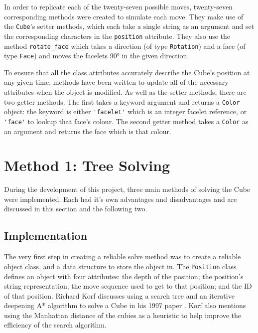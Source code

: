 \documentclass{report}
\begin{document}
    In order to replicate each of the twenty-seven possible moves, twenty-seven corresponding methods were created to simulate each move. They make use of the \lstinline|Cube|'s setter methods, which each take a single string as an argument and set the corresponding characters in the \lstinline|position| attribute. They also use the method \lstinline|rotate_face| which takes a direction (of type \lstinline|Rotation|) and a face (of type \lstinline|Face|) and moves the facelets \ang{90} in the given direction.
    
    To ensure that all the class attributes accurately describe the Cube's position at any given time, methods have been written to update all of the necessary attributes when the object is modified. As well as the setter methods, there are two getter methods. The first takes a keyword argument and returns a \lstinline|Color| object: the keyword is either \lstinline|'facelet'| which is an integer facelet reference, or \lstinline|'face'| to lookup that face's colour. The second getter method takes a \lstinline|Color| as an argument and returns the face which is that colour.
    
    \section{Method 1: Tree Solving} \label{sec:treeSolving}
    
    During the development of this project, three main methods of solving the Cube were implemented. Each had it's own advantages and disadvantages and are discussed in this section and the following two.
    
    \subsection{Implementation}
    
    The very first step in creating a reliable solve method was to create a reliable object class, and a data structure to store the object in. The \lstinline|Position| class defines an object with four attributes: the depth of the position; the position's string representation; the move sequence used to get to that position; and the ID of that position. Richard Korf discusses using a search tree and an iterative deepening A* algorithm to solve a Cube in his 1997 paper \cite{Korf1997}. Korf also mentions using the Manhattan distance of the cubies as a heuristic to help improve the efficiency of the search algorithm. 
    
\end{document}
